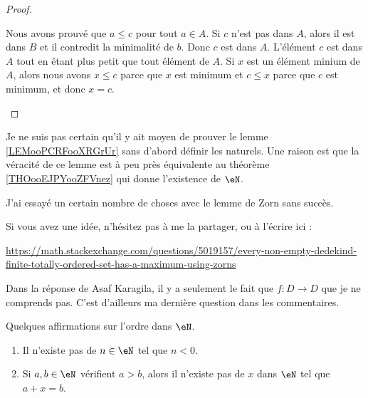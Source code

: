 \begin{proof}
\begin{subproof}
		Nous avons prouvé que \( a\leq c\) pour tout \( a\in A\).
		\spitem[\( c\in A\)]
		Si \( c\) n'est pas dans \( A\), alors il est dans \( B\) et il contredit la minimalité de \( b\). Donc \( c\) est dans \( A\).
		\spitem[Conclusion]
		L'élément \( c\) est dans \( A\) tout en étant plus petit que tout élément de \( A\).
		\spitem[Unicité]
		Si \( x\) est un élément minium de \( A\), alors nous avons \( x\leq c\) parce que \( x\) est minimum et \( c\leq x\) parce que \( c\) est minimum, et donc \( x=c\).
	\end{subproof}
\end{proof}


\begin{probleme}		\label{PROBooUCQFooTugfDl}
	Je ne suis pas certain qu'il y ait moyen de prouver le lemme \ref{LEMooPCRFooXRGrUr} sans d'abord définir les naturels. Une raison est que la véracité de ce lemme est à peu près équivalente au théorème \ref{THOooEJPYooZFVnez} qui donne l'existence de \( \eN\).

	J'ai essayé un certain nombre de choses avec le lemme de Zorn sans succès.

	Si vous avez une idée, n'hésitez pas à me la partager, ou à l'écrire ici :
	\begin{center}
		\url{https://math.stackexchange.com/questions/5019157/every-non-empty-dedekind-finite-totally-ordered-set-has-a-maximum-using-zorns}
	\end{center}

	Dans la réponse de Asaf Karagila, il y a seulement le fait que \(f \colon D\to D  \) que je ne comprends pas. C'est d'ailleurs ma dernière question dans les commentaires.
\end{probleme}




\begin{lemma}       \label{LEMooYMRJooYIAhBb}
	Quelques affirmations sur l'ordre dans \( \eN\).
	\begin{enumerate}
		\item       \label{ITEMooTLOIooTWNtod}
		      Il n'existe pas de \( n\in \eN\) tel que \( n<0\).
		\item       \label{ITEMooPJKQooGfLCUM}
		      Si \( a,b\in \eN\) vérifient \( a>b\), alors il n'existe pas de \( x\) dans \( \eN\) tel que \( a+x=b\).
	\end{enumerate}
\end{lemma}

